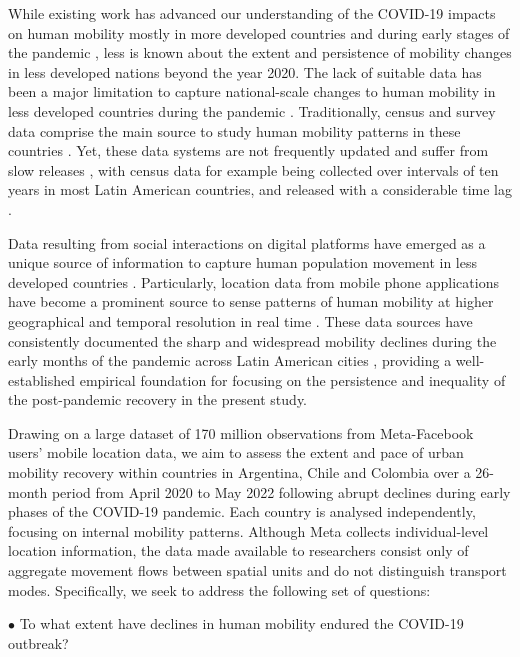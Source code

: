 \documentclass[fleqn,10pt]{wlscirep}
\begin{document}
While existing work has advanced our understanding of the COVID-19 impacts on human mobility mostly in more developed countries and during early stages of the pandemic \cite{gonzález-leonardo2022b, roweCalafiore2022, rowe2023, wang2022}, less is known about the extent and persistence of mobility changes in less developed nations beyond the year 2020. The lack of suitable data has been a major limitation to capture national-scale changes to human mobility in less developed countries during the pandemic \cite{ RoweCCA24}. Traditionally, census and survey data comprise the main source to study human mobility patterns in these countries \cite{bell2014}. Yet, these data systems are not frequently updated and suffer from slow releases \cite{rowe2023big, Cabrera-Arnau2023}, with census data for example being collected over intervals of ten years in most Latin American countries, and released with a considerable time lag \cite{bell2014}. 

Data resulting from social interactions on digital platforms have emerged as a unique source of information to capture human population movement in less developed countries \cite{rowe2023big}. Particularly, location data from mobile phone applications have become a prominent source to sense patterns of human mobility at higher geographical and temporal resolution in real time \cite{calafiore2023, iradukunda2025}. These data sources have consistently documented the sharp and widespread mobility declines during the early months of the pandemic across Latin American cities \cite{RoweCCA24, covidMexico24, elejalde2024, demography25}, providing a well-established empirical foundation for focusing on the persistence and inequality of the post-pandemic recovery in the present study.

Drawing on a large dataset of 170 million observations from Meta-Facebook users' mobile location data, we aim to assess the extent and pace of urban mobility recovery within countries in Argentina, Chile and Colombia over a 26-month period from April 2020 to May 2022 following abrupt declines during early phases of the COVID-19 pandemic. Each country is analysed independently, focusing on internal mobility patterns. Although Meta collects individual-level location information, the data made available to researchers consist only of aggregate movement flows between spatial units and do not distinguish transport modes. Specifically, we seek to address the following set of questions:

$\bullet$ To what extent have declines in human mobility endured the COVID-19 outbreak? 
 
\end{document}
